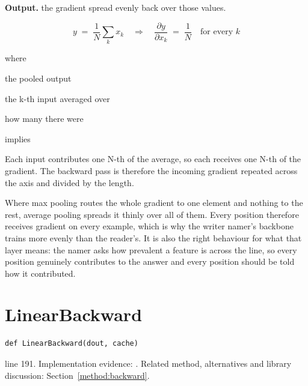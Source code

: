 \noindent\textbf{Output.} the gradient spread evenly back over those values.



\begin{equation}
y \;=\; \frac{1}{N}\sum_{k} x_k \quad\Longrightarrow\quad \frac{\partial y}{\partial x_k} \;=\; \frac{1}{N} \quad\text{for every } k
\end{equation}

\noindent where
\begin{description}[leftmargin=2.4em,style=nextline,font=\normalfont\ttfamily]\setlength\itemsep{1pt}
  \item[{$y$}] \normalfont the pooled output
  \item[{$x_k$}] \normalfont the k-th input averaged over
  \item[{$N$}] \normalfont how many there were
  \item[{$\Longrightarrow$}] \normalfont implies
\end{description}
Each input contributes one N-th of the average, so each receives one N-th of the gradient. The backward pass is therefore the incoming gradient repeated across the axis and divided by the length.


Where max pooling routes the whole gradient to one element and nothing to the rest, average pooling spreads it thinly over all of them. Every position therefore receives gradient on every example, which is why the writer namer's backbone trains more evenly than the reader's. It is also the right behaviour for what that layer means: the namer asks how prevalent a feature is across the line, so every position genuinely contributes to the answer and every position should be told how it contributed.



\section{LinearBackward}\label{fn:train:LinearBackward}
\begin{lstlisting}[style=sig]
def LinearBackward(dout, cache)
\end{lstlisting}
 line 191. Implementation evidence: \cite{code2026}. Related method, alternatives and library discussion: Section~\ref{method:backward}.


